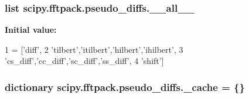 \subsubsection[{\+\_\+\+\_\+all\+\_\+\+\_\+}]{\setlength{\rightskip}{0pt plus 5cm}list scipy.\+fftpack.\+pseudo\+\_\+diffs.\+\_\+\+\_\+all\+\_\+\+\_\+}\label{namespacescipy_1_1fftpack_1_1pseudo__diffs_a66deb77dd40743d440d6a71eb71341a2}
{\bfseries Initial value\+:}
\begin{DoxyCode}
1 = [\textcolor{stringliteral}{'diff'},
2            \textcolor{stringliteral}{'tilbert'},\textcolor{stringliteral}{'itilbert'},\textcolor{stringliteral}{'hilbert'},\textcolor{stringliteral}{'ihilbert'},
3            \textcolor{stringliteral}{'cs\_diff'},\textcolor{stringliteral}{'cc\_diff'},\textcolor{stringliteral}{'sc\_diff'},\textcolor{stringliteral}{'ss\_diff'},
4            \textcolor{stringliteral}{'shift'}]
\end{DoxyCode}
\hypertarget{namespacescipy_1_1fftpack_1_1pseudo__diffs_adb08a0217dd62951147e1c426b48a575}{}
\subsubsection[{\+\_\+cache}]{\setlength{\rightskip}{0pt plus 5cm}dictionary scipy.\+fftpack.\+pseudo\+\_\+diffs.\+\_\+cache = \{\}}\label{namespacescipy_1_1fftpack_1_1pseudo__diffs_adb08a0217dd62951147e1c426b48a575}

